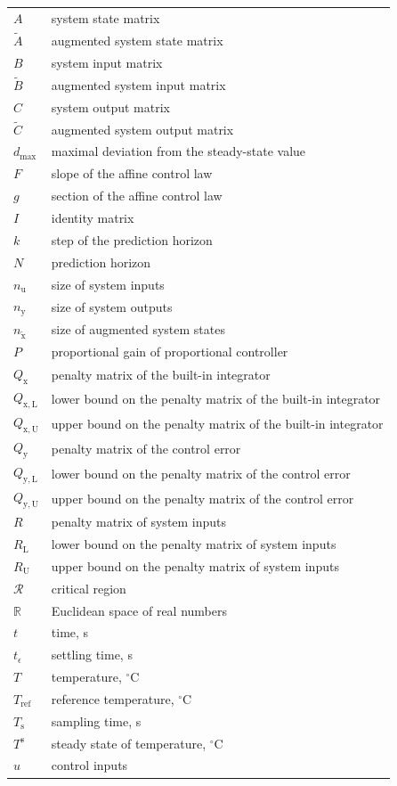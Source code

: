 \documentclass[preprint,12pt]{elsarticle}
\begin{document}
		\begin{tabular}{ l l }
			$A$ & system state matrix \\
			$\widetilde{A}$ & augmented system state matrix \\
			$B$ & system input matrix \\
			$\widetilde{B}$ & augmented system input matrix \\
			$C$ & system output matrix \\
			$\widetilde{C}$ & augmented system output matrix \\
			$d_{\max}$ & maximal deviation from the steady-state value \\
			$F$ & slope of the affine control law \\
			$g$ & section of the affine control law \\
			$I$ & identity matrix \\
			$k$ & step of the prediction horizon \\
			$N$ & prediction horizon \\
			$n_{\mathrm{u}}$ & size of system inputs \\
			$n_{\mathrm{y}}$ & size of system outputs \\
			$n_{\widetilde{\mathrm{x}}}$ & size of augmented system states \\
			$P$ & proportional gain of proportional controller\\
			$Q_{\mathrm{x}}$ & penalty matrix of the built-in integrator \\
			$Q_{\mathrm{x,L}}$ & lower bound on the penalty matrix of the built-in integrator \\
			$Q_{\mathrm{x,U}}$ & upper bound on the penalty matrix of the built-in integrator \\
			$Q_{\mathrm{y}}$ & penalty matrix of the control error \\
			$Q_{\mathrm{y,L}}$ & lower bound on the penalty matrix of the control error \\
			$Q_{\mathrm{y,U}}$ & upper bound on the penalty matrix of the control error \\
			$R$ & penalty matrix of system inputs \\
			$R_{\mathrm{L}}$ & lower bound on the penalty matrix of system inputs \\
			$R_{\mathrm{U}}$ & upper bound on the penalty matrix of system inputs \\
			$\mathcal{R}$ & critical region \\
			$\mathbb{R}$ & Euclidean space of real numbers \\
			$t$ & time, s \\
			$t_{\epsilon}$ & settling time, s \\
			$T$ & temperature, $^{\circ}\mathrm{C}$ \\
			$T_{\mathrm{ref}}$ & reference temperature, $^{\circ}\mathrm{C}$ \\
			$T_{\mathrm{s}}$ & sampling time, s \\
			$T^{\mathrm{s}}$ & steady state of temperature, $^{\circ}\mathrm{C}$ \\
			$u$ & control inputs \\
		\end{tabular}
	
\end{document}
